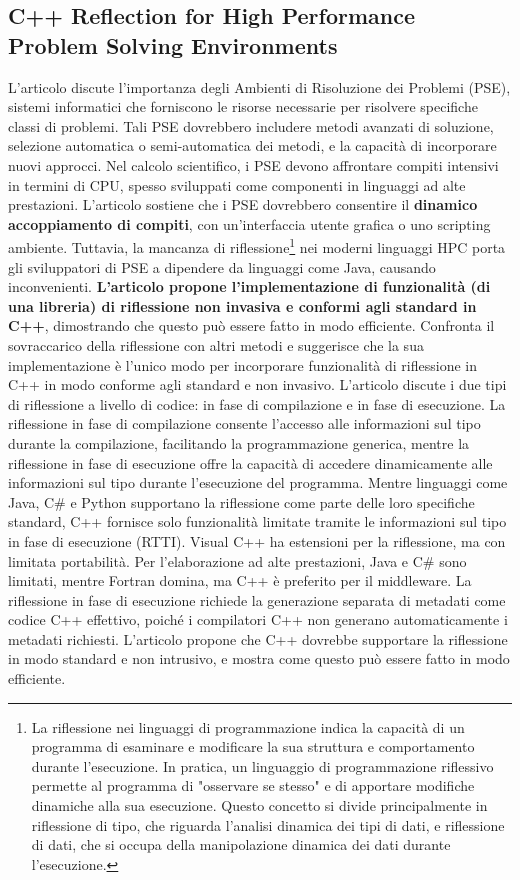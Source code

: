\documentclass[11pt]{article}
\begin{document}
\begin{multicols*}{2}[\columnsep=1cm]
    \section{C++ Reflection for High Performance Problem Solving Environments}
    L'articolo discute l'importanza degli Ambienti di Risoluzione dei Problemi (PSE), sistemi informatici che forniscono le risorse necessarie per risolvere specifiche classi di problemi. 
    Tali PSE dovrebbero includere metodi avanzati di soluzione, selezione automatica o semi-automatica dei metodi, e la capacità di incorporare nuovi approcci.
    Nel calcolo scientifico, i PSE devono affrontare compiti intensivi in termini di CPU, spesso sviluppati come componenti in linguaggi ad alte prestazioni. 
    L'articolo sostiene che i PSE dovrebbero consentire il \textbf{dinamico accoppiamento di compiti}, con un'interfaccia utente grafica o uno scripting ambiente. 
    Tuttavia, la mancanza di riflessione\footnote{
        La riflessione nei linguaggi di programmazione indica la capacità di un programma di esaminare e modificare la sua struttura e comportamento durante l'esecuzione. In pratica, un linguaggio di programmazione riflessivo permette al programma di "osservare se stesso" e di apportare modifiche dinamiche alla sua esecuzione. Questo concetto si divide principalmente in riflessione di tipo, che riguarda l'analisi dinamica dei tipi di dati, e riflessione di dati, che si occupa della manipolazione dinamica dei dati durante l'esecuzione.} nei moderni linguaggi HPC porta gli sviluppatori di PSE a dipendere da linguaggi come Java, causando inconvenienti.
    \textbf{L'articolo propone l'implementazione di funzionalità (di una libreria) di riflessione non invasiva e conformi agli standard in C++}, dimostrando che questo può essere fatto in modo efficiente. 
    Confronta il sovraccarico della riflessione con altri metodi e suggerisce che la sua implementazione è l'unico modo per incorporare funzionalità di riflessione in C++ in modo conforme agli standard e non invasivo.
    L'articolo discute i due tipi di riflessione a livello di codice: in fase di compilazione e in fase di esecuzione. La riflessione in fase di compilazione consente l'accesso alle informazioni sul tipo durante la compilazione, facilitando la programmazione generica, mentre la riflessione in fase di esecuzione offre la capacità di accedere dinamicamente alle informazioni sul tipo durante l'esecuzione del programma.
    Mentre linguaggi come Java, C\# e Python supportano la riflessione come parte delle loro specifiche standard, C++ fornisce solo funzionalità limitate tramite le informazioni sul tipo in fase di esecuzione (RTTI). Visual C++ ha estensioni per la riflessione, ma con limitata portabilità. Per l'elaborazione ad alte prestazioni, Java e C\# sono limitati, mentre Fortran domina, ma C++ è preferito per il middleware.
    La riflessione in fase di esecuzione richiede la generazione separata di metadati come codice C++ effettivo, poiché i compilatori C++ non generano automaticamente i metadati richiesti. L'articolo propone che C++ dovrebbe supportare la riflessione in modo standard e non intrusivo, e mostra come questo può essere fatto in modo efficiente.
    

\end{multicols*}
\end{document}
